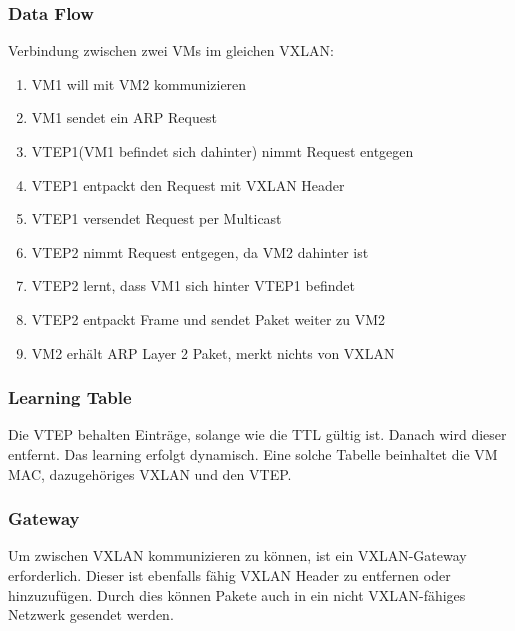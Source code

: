 \documentclass[a4,12pt]{scrartcl}
\begin{document}
\subsubsection{Data Flow}
Verbindung zwischen zwei VMs im gleichen VXLAN: 
\begin{enumerate}
\item VM1 will mit VM2 kommunizieren 
\item VM1 sendet ein ARP Request 
\item VTEP1(VM1 befindet sich dahinter) nimmt Request entgegen 
\item VTEP1 entpackt den Request mit VXLAN Header 
\item VTEP1 versendet Request per Multicast 
\item VTEP2 nimmt Request entgegen, da VM2 dahinter ist 
\item VTEP2 lernt, dass VM1 sich hinter VTEP1 befindet 
\item VTEP2 entpackt Frame und sendet Paket weiter zu VM2
\item VM2 erhält ARP Layer 2 Paket, merkt nichts von VXLAN
\end{enumerate}

\subsubsection{Learning Table}
Die VTEP behalten Einträge, solange wie die TTL gültig ist. Danach wird dieser entfernt. Das learning erfolgt dynamisch. Eine solche Tabelle beinhaltet die VM MAC, dazugehöriges VXLAN und den VTEP. 

\subsubsection{Gateway}
Um zwischen VXLAN kommunizieren zu können, ist ein VXLAN-Gateway erforderlich. Dieser ist ebenfalls fähig VXLAN Header zu entfernen oder hinzuzufügen. Durch dies können Pakete auch in ein nicht VXLAN-fähiges Netzwerk gesendet werden. 
\end{document}
